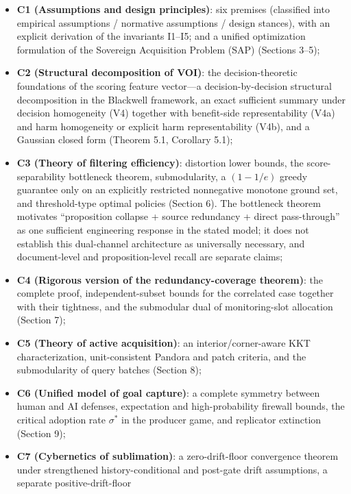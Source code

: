 \documentclass[
  11pt]{article}
\providecommand{\tightlist}{%
  \setlength{\itemsep}{0pt}\setlength{\parskip}{0pt}}
\begin{document}
\begin{itemize}
\tightlist
\item
  \textbf{C1 (Assumptions and design principles)}: six premises
  (classified into empirical assumptions / normative assumptions /
  design stances), with an explicit derivation of the invariants I1--I5;
  and a unified optimization formulation of the Sovereign Acquisition
  Problem (SAP) (Sections 3--5);
\item
  \textbf{C2 (Structural decomposition of VOI)}: the decision-theoretic
  foundations of the scoring feature vector---a decision-by-decision
  structural decomposition in the Blackwell framework, an exact
  sufficient summary under decision homogeneity (V4) together with
  benefit-side representability (V4a) and harm homogeneity or explicit
  harm representability (V4b), and a Gaussian closed form (Theorem 5.1,
  Corollary 5.1);
\item
  \textbf{C3 (Theory of filtering efficiency)}: distortion lower bounds,
  the score-separability bottleneck theorem, submodularity, a
  \((1-1/e)\) greedy guarantee only on an explicitly restricted
  nonnegative monotone ground set, and threshold-type optimal policies
  (Section 6). The bottleneck theorem motivates ``proposition collapse +
  source redundancy + direct pass-through'' as one sufficient
  engineering response in the stated model; it does not establish this
  dual-channel architecture as universally necessary, and document-level
  and proposition-level recall are separate claims;
\item
  \textbf{C4 (Rigorous version of the redundancy-coverage theorem)}: the
  complete proof, independent-subset bounds for the correlated case
  together with their tightness, and the submodular dual of
  monitoring-slot allocation (Section 7);
\item
  \textbf{C5 (Theory of active acquisition)}: an interior/corner-aware
  KKT characterization, unit-consistent Pandora and patch criteria, and
  the submodularity of query batches (Section 8);
\item
  \textbf{C6 (Unified model of goal capture)}: a complete symmetry
  between human and AI defenses, expectation and high-probability
  firewall bounds, the critical adoption rate \(\sigma^*\) in the
  producer game, and replicator extinction (Section 9);
\item
  \textbf{C7 (Cybernetics of sublimation)}: a zero-drift-floor
  convergence theorem under strengthened history-conditional and
  post-gate drift assumptions, a separate positive-drift-floor

\end{itemize}
\end{document}
